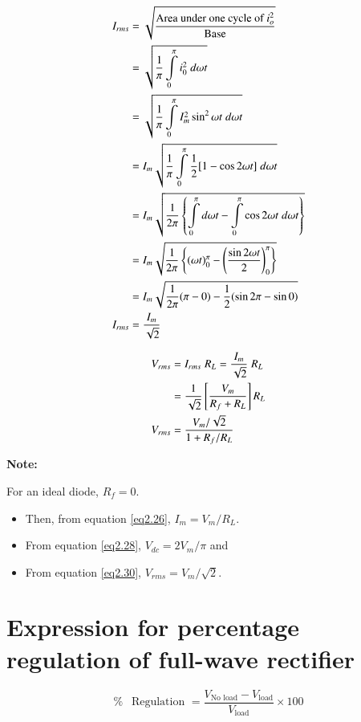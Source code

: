 \begin{align}
I_{rms} & = \sqrt{\frac{\text{Area under one cycle of
    $i^2_o$}}{\text{Base}}} \notag\\
& = \sqrt{\frac{1}{\pi} \int\limits^\pi_0 i^2_0\; d \omega t} \notag\\
& = \sqrt{\frac{1}{\pi} \int\limits^\pi_0 I^2_m \sin^2 \omega t \; d
  \omega t} \notag\\
& = I_m \sqrt{ \frac{1}{\pi} \int\limits^\pi_0 \frac{1}{2} [1-\cos 2
    \omega t]\; d \omega t} \notag\\
& = I_m \sqrt{\frac{1}{2 \pi} \left\{ \int\limits^\pi_0 d \omega t -
  \int\limits^\pi_0 \cos 2 \omega t \; d \omega t\right\}} \notag\\
& = I_m \sqrt{\frac{1}{2\pi} \left\{(\omega t)^\pi_0 -
  \left(\frac{\sin 2 \omega t}{2} \right)^\pi_0 \right\}} \notag\\
& = I_m \sqrt{\frac{1}{2 \pi} (\pi -0) - \frac{1}{2} (\sin 2 \pi -
  \sin 0)} \notag\\
I_{rms} & = \frac{I_m}{\sqrt{2}} \label{eq2.29}
\end{align}

\begin{align}
V_{rms} & = I_{rms}\; R_L  = \frac{I_m}{\sqrt{2}}\; R_L \notag\\
& = \frac{1}{\sqrt{2}} \left[\frac{V_m}{R_f+R_L} \right] R_L \notag\\
V_{rms} & = \frac{V_m/\sqrt{2}}{1+R_f/R_L} \label{eq2.30}
\end{align}

\medskip
\noindent\textbf{Note:}

For an ideal diode, $R_f = 0$.
\begin{itemize}
\itemsep=0pt
\item Then, from equation \eqref{eq2.26}, $I_m = V_m/R_L$.

\item From equation \eqref{eq2.28}, $V_{dc} = 2 V_{m}/\pi$ and 

\item From equation \eqref{eq2.30}, $V_{rms} = V_m/\sqrt{2}$.
\end{itemize}

\section{Expression for percentage regulation of full-wave
  rectifier}\label{sec2.11}
$$
\% ~~ \text{ Regulation } = \frac{V_{\text{No load}}
  -V_{\text{load}}}{ V_{\text{load}}} \times 100
$$

